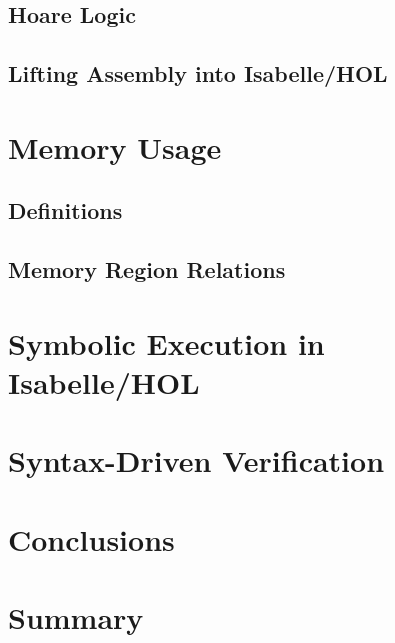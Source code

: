 \documentclass[nopageskip,prelim]{VTthesis} %
\begin{document}
  \section{Hoare Logic}
  \section{Lifting Assembly into Isabelle/HOL}
  
  \chapter{Memory Usage}
  \section{Definitions}
  \section{Memory Region Relations}
  
  \chapter{Symbolic Execution in Isabelle/HOL}
  
  
  
  \chapter{Syntax-Driven Verification} %

	\chapter{Conclusions}\label{ch:conclusions}
	\chapter{Summary}\label{ch:summary} %

	
	

	\appendix
\end{document}
